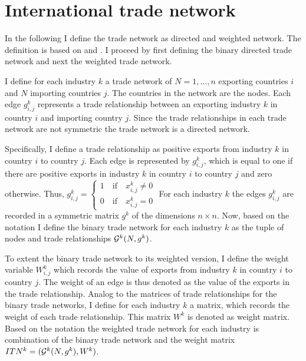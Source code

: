 \section{International trade network}
In the following I define the trade network as directed and weighted network.
 The definition is based on \textcite{jackson2010} and \textcite{de2010}. I proceed by first defining the binary directed trade network and next the weighted trade network.\par
I define for each industry $k$ a trade network of $N = 1, \dots , n$ exporting countries $i$  and $N$ importing countries $j$.
The countries in the network are the nodes.
Each edge $g_{i,j}^k $ represents a trade relationship between an exporting industry $k$ in country $i$ and importing country $j$.
Since the trade relationships in each trade network are not symmetric the trade network is a directed network.%
 \par
Specifically, I define a trade relationship as positive exports from industry $k$ in country $i$ to country $j$.
Each edge is represented by $g_{i,j}^k$, which is equal to one if there are positive exports in industry $k$ in country $i$ to country $j$ and zero otherwise.
Thus,
$g_{i,j}^k = \begin{cases}
 1 \quad \text{if} \quad x_{i,j}^k \neq 0 \\
0 \quad \text{if} \quad x_{i,j}^k = 0 \end{cases} $
For each industry $k$ the edges $g_{i,j}^k$ are recorded in a symmetric matrix  $g^k$  of the dimensions $n \times n$.
Now, based on the notation I define the binary trade network for each industry $k$ as the tuple of nodes and trade relationships $\mathcal{G}^k(N, g^k)$. \par
To extent the binary trade network to its weighted version, I define the
weight variable $W_{i,j}^k$ which records the value of exports from industry $k$  in country $i$ to country $j$.
The weight of an edge  is thus denoted as the value of the exports in the trade relationship.
Analog to the matrices of trade relationships for the binary trade networks, I define for each industry $k$ a matrix, which records the weight of each trade relationship.
  This matrix $W^k$ is denoted as weight matrix. %
Based on the notation the weighted trade network for each industry is combination of the binary trade network and the weight matrix  $ITN^k =( \mathcal{G}^k(N, g^k),W^k)$.
